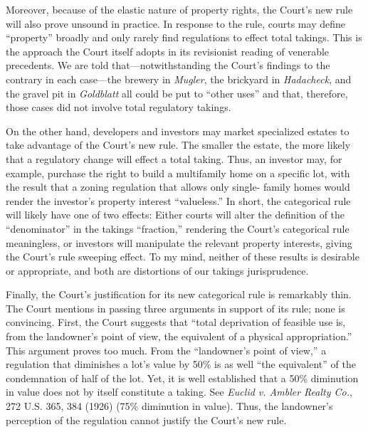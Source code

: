 Moreover, because of the elastic nature of property rights, the Court's new rule
will also prove unsound in practice. In response to the rule, courts may define
``property'' broadly and only rarely find regulations to effect total takings.
This is the approach the Court itself adopts in its revisionist reading of
venerable precedents. We are told that---notwithstanding the Court's findings to
the contrary in each case---the brewery in \textit{Mugler}, the brickyard in
\textit{Hadacheck}, and the gravel pit in \textit{Goldblatt} all could be put to
``other uses'' and that, therefore, those cases did not involve total regulatory
takings.

On the other hand, developers and investors may market specialized estates to
take advantage of the Court's new rule. The smaller the estate, the more likely
that a regulatory change will effect a total taking. Thus, an investor may, for
example, purchase the right to build a multifamily home on a specific lot, with
the result that a zoning regulation that allows only single- family homes would
render the investor's property interest ``valueless.'' In short, the categorical
rule will likely have one of two effects: Either courts will alter the
definition of the ``denominator'' in the takings ``fraction,'' rendering the
Court's categorical rule meaningless, or investors will manipulate the relevant
property interests, giving the Court's rule sweeping effect. To my mind, neither
of these results is desirable or appropriate, and both are distortions of our
takings jurisprudence.

Finally, the Court's justification for its new categorical rule is remarkably
thin. The Court mentions in passing three arguments in support of its rule; none
is convincing. First, the Court suggests that ``total deprivation of feasible
use is, from the landowner's point of view, the equivalent of a physical
appropriation.'' This argument proves too much. From the ``landowner's point of
view,'' a regulation that diminishes a lot's value by 50\% is as well ``the
equivalent'' of the condemnation of half of the lot. Yet, it is well established
that a 50\% diminution in value does not by itself constitute a taking. See
\textit{Euclid v. Ambler Realty Co.}, 272 U.S. 365, 384 (1926) (75\% diminution
in value). Thus, the landowner's perception of the regulation cannot justify the
Court's new rule.

